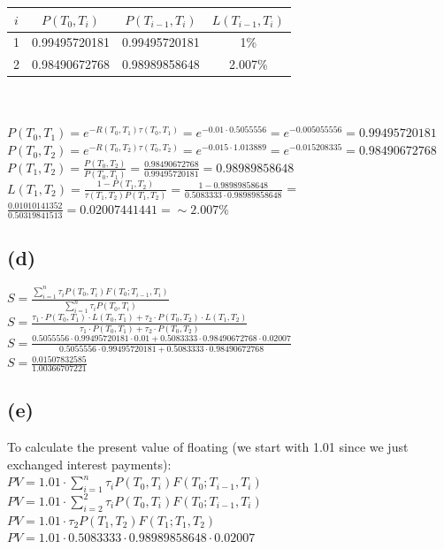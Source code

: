 \documentclass{article}
\begin{document}
{\begin{tabular}{ | c | c | c | c |}
	\hline
		$i$ & $P(T_0, T_i)$ & $P(T_{i-1}, T_i)$ & $L(T_{i-1}, T_i)$ \\
  \hline
		1 & 0.99495720181 & 0.99495720181 & 1\% \\
  \hline
		2 & 0.98490672768 & 0.98989858648 & 2.007\% \\
	\hline
\end{tabular} \\ \\
$P(T_0, T_1) = e^{-R(T_0, T_1)\tau(T_0, T_1)} = e^{-0.01 \cdot 0.5055556} = e^{-0.005055556} = 0.99495720181$ \\
$P(T_0, T_2) = e^{-R(T_0, T_2)\tau(T_0, T_2)} = e^{-0.015 \cdot 1.013889} = e^{-0.015208335} = 0.98490672768$ \\
$P(T_1, T_2) = \frac{P(T_0, T_2)}{P(T_0, T_1)} = \frac{0.98490672768}{0.99495720181} = 0.98989858648$ \\
$L(T_1, T_2) = \frac{1 - P(T_1, T_2)}{\tau(T_1, T_2) P(T_1, T_2)} = \frac{1 - 0.98989858648}{0.5083333 \cdot 0.98989858648}$ = $\frac{0.01010141352}{0.50319841513} = 0.02007441441 = \sim 2.007\%$

\subsection*{(d)}

$S = \frac{\sum_{i=1}^{n} \tau_i P(T_0, T_i) F(T_0; T_{i-1}, T_i)}{\sum_{i=1}^{n} \tau_i P(T_0, T_i)}$ \\
$S = \frac{\tau_1 \cdot P(T_0, T_1) \cdot L(T_0, T_1) + \tau_2 \cdot P(T_0, T_2) \cdot L(T_1, T_2)}{\tau_1 \cdot P(T_0, T_1) + \tau_2 \cdot P(T_0, T_2)}$ \\
$S = \frac{0.5055556 \cdot 0.99495720181 \cdot 0.01 + 0.5083333 \cdot 0.98490672768 \cdot 0.02007}{0.5055556 \cdot 0.99495720181 + 0.5083333 \cdot 0.98490672768}$ \\
$S = \frac{0.01507832585}{1.00366707221}$ \\

\subsection*{(e)}

To calculate the present value of floating (we start with 1.01 since we just exchanged interest payments): \\
$PV = 1.01 \cdot \sum_{i=1}^{n} \tau_i P(T_0, T_i) F(T_0; T_{i-1}, T_i)$ \\
$PV = 1.01 \cdot \sum_{i=2}^{2} \tau_i P(T_0, T_i) F(T_0; T_{i-1}, T_i)$ \\
$PV = 1.01 \cdot \tau_2 P(T_1, T_2) F(T_1; T_1, T_2)$ \\
$PV = 1.01 \cdot 0.5083333 \cdot  0.98989858648 \cdot 0.02007$ \\

}
\end{document}
